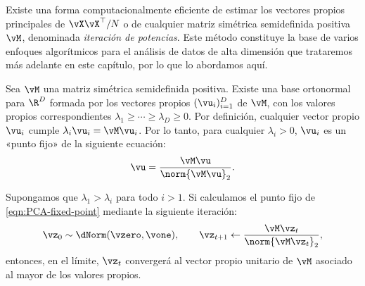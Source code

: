\documentclass[../../book-main.tex]{subfiles}
\begin{document}
Existe una forma computacionalmente eficiente de estimar los vectores propios principales 
de \(\vX\vX^{\top}/N\) o de cualquier matriz simétrica semidefinida positiva
\(\vM\), denominada \textit{iteración de potencias}. Este
método constituye la base de varios enfoques algorítmicos para el
análisis de datos de alta dimensión que trataremos más adelante en este capítulo,
por lo que lo abordamos aquí.

Sea \(\vM\) una matriz simétrica semidefinida positiva. Existe
una base ortonormal para \(\R^{D}\) formada por los vectores propios
\((\vu_{i})_{i = 1}^{D}\) de \(\vM\), con los valores propios correspondientes
\(\lambda_{1} \geq \cdots \geq \lambda_{D} \geq 0\). Por definición,
cualquier vector propio $\vu_i$ cumple $\lambda_i \vu_i = \vM \vu_i$.
Por lo tanto, para cualquier $\lambda_i > 0$, $\vu_i$ es un «punto fijo» de
la siguiente ecuación:
\begin{equation}
    \vu = \frac{\vM\vu}{\norm{\vM\vu}_{2}}.
    \label{eqn:PCA-fixed-point}
\end{equation}

\begin{theorem}
    Supongamos que \(\lambda_{1} > \lambda_{i}\) para todo \(i > 1\). Si
    calculamos el punto fijo de \eqref{eqn:PCA-fixed-point} mediante
    la siguiente iteración:
    \begin{equation}\label{eq:power_iteration}
        \vz_{0} \sim \dNorm(\vzero, \vone), \qquad \vz_{t + 1} \gets
        \frac{\vM\vz_{t}}{\norm{\vM\vz_{t}}_{2}},
    \end{equation}
    entonces, en el límite, \(\vz_{t}\) convergerá al vector propio unitario de \(\vM\)
    asociado al mayor de los valores propios.
\end{theorem}
\end{document}
